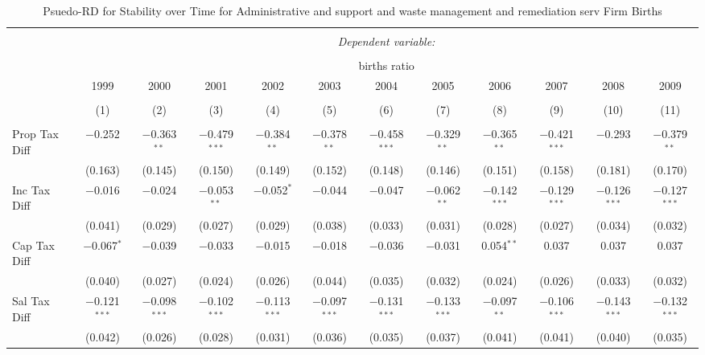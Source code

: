 
\begin{table}[!htbp] \centering 
  \caption{Psuedo-RD for Stability over Time for  Administrative and support and waste management and remediation serv Firm Births} 
  \label{56year} 
\small 
\begin{tabular}{@{\extracolsep{5pt}}lccccccccccc} 
\\[-1.8ex]\hline 
\hline \\[-1.8ex] 
 & \multicolumn{11}{c}{\textit{Dependent variable:}} \\ 
\cline{2-12} 
\\[-1.8ex] & \multicolumn{11}{c}{births ratio} \\ 
 & 1999 & 2000 & 2001 & 2002 & 2003 & 2004 & 2005 & 2006 & 2007 & 2008 & 2009 \\ 
\\[-1.8ex] & (1) & (2) & (3) & (4) & (5) & (6) & (7) & (8) & (9) & (10) & (11)\\ 
\hline \\[-1.8ex] 
 Prop Tax Diff & $-$0.252 & $-$0.363$^{**}$ & $-$0.479$^{***}$ & $-$0.384$^{**}$ & $-$0.378$^{**}$ & $-$0.458$^{***}$ & $-$0.329$^{**}$ & $-$0.365$^{**}$ & $-$0.421$^{***}$ & $-$0.293 & $-$0.379$^{**}$ \\ 
  & (0.163) & (0.145) & (0.150) & (0.149) & (0.152) & (0.148) & (0.146) & (0.151) & (0.158) & (0.181) & (0.170) \\ 
  Inc Tax Diff & $-$0.016 & $-$0.024 & $-$0.053$^{**}$ & $-$0.052$^{*}$ & $-$0.044 & $-$0.047 & $-$0.062$^{**}$ & $-$0.142$^{***}$ & $-$0.129$^{***}$ & $-$0.126$^{***}$ & $-$0.127$^{***}$ \\ 
  & (0.041) & (0.029) & (0.027) & (0.029) & (0.038) & (0.033) & (0.031) & (0.028) & (0.027) & (0.034) & (0.032) \\ 
  Cap Tax Diff & $-$0.067$^{*}$ & $-$0.039 & $-$0.033 & $-$0.015 & $-$0.018 & $-$0.036 & $-$0.031 & 0.054$^{**}$ & 0.037 & 0.037 & 0.037 \\ 
  & (0.040) & (0.027) & (0.024) & (0.026) & (0.044) & (0.035) & (0.032) & (0.024) & (0.026) & (0.033) & (0.032) \\ 
  Sal Tax Diff & $-$0.121$^{***}$ & $-$0.098$^{***}$ & $-$0.102$^{***}$ & $-$0.113$^{***}$ & $-$0.097$^{***}$ & $-$0.131$^{***}$ & $-$0.133$^{***}$ & $-$0.097$^{**}$ & $-$0.106$^{***}$ & $-$0.143$^{***}$ & $-$0.132$^{***}$ \\ 
  & (0.042) & (0.026) & (0.028) & (0.031) & (0.036) & (0.035) & (0.037) & (0.041) & (0.041) & (0.040) & (0.035) \\ 

\end{tabular}
\end{table}
